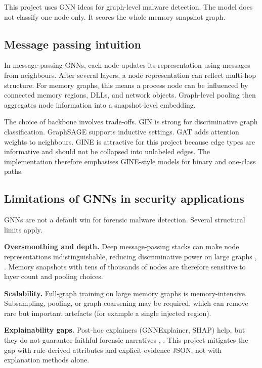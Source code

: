 This project uses GNN ideas for graph-level malware detection. The model does not classify one node only. It scores the whole memory snapshot graph.

\subsection{Message passing intuition}

In message-passing GNNs, each node updates its representation using messages from neighbours. After several layers, a node representation can reflect multi-hop structure. For memory graphs, this means a process node can be influenced by connected memory regions, DLLs, and network objects. Graph-level pooling then aggregates node information into a snapshot-level embedding.

The choice of backbone involves trade-offs. GIN is strong for discriminative graph classification. GraphSAGE supports inductive settings. GAT adds attention weights to neighbours. GINE is attractive for this project because edge types are informative and should not be collapsed into unlabeled edges. The implementation therefore emphasises GINE-style models for binary and one-class paths.

\subsection{Limitations of GNNs in security applications}

GNNs are not a default win for forensic malware detection. Several structural limits apply.

\textbf{Oversmoothing and depth.} Deep message-passing stacks can make node representations indistinguishable, reducing discriminative power on large graphs \cite{rusch2023oversmoothing}, \cite{chen2022gnnsurvey}. Memory snapshots with tens of thousands of nodes are therefore sensitive to layer count and pooling choices.

\textbf{Scalability.} Full-graph training on large memory graphs is memory-intensive. Subsampling, pooling, or graph coarsening may be required, which can remove rare but important artefacts (for example a single injected region).

\textbf{Explainability gaps.} Post-hoc explainers (GNNExplainer, SHAP) help, but they do not guarantee faithful forensic narratives \cite{ying2019gnnexplainer}, \cite{lundberg2017shap}. This project mitigates the gap with rule-derived attributes and explicit evidence JSON, not with explanation methods alone.

